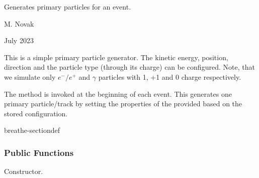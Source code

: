 \documentclass[letterpaper,10pt,english]{sphinxmanual}
\begin{document}
\begin{fulllineitems}
\label{\detokenize{Simulation/SimulationCodeDoc:_CPPv416PrimaryGenerator}}
\pysigstartsignatures
\pysigstartmultiline
{}
\pysigstopmultiline
\pysigstopsignatures
\sphinxAtStartPar
Generates primary particles for an event. 

\sphinxAtStartPar
\begin{description}
\sphinxAtStartPar
M. Novak 

\sphinxAtStartPar
July 2023

\end{description}


\sphinxAtStartPar
This is a simple primary particle generator. The kinetic energy, position, direction and the particle type (through its charge) can be configured. Note, that we simulate only \(e^-/e^+\) and \(\gamma\) particles with \sphinxhyphen{}1, +1 and 0 charge respectively.

\sphinxAtStartPar
The  method is invoked at the beginning of each event. This generates one primary particle/track by setting the properties of the provided  based on the stored configuration. 

\begin{sphinxuseclass}{breathe-sectiondef}\subsubsection*{Public Functions}

\begin{fulllineitems}
\label{\detokenize{Simulation/SimulationCodeDoc:_CPPv4N16PrimaryGenerator16PrimaryGeneratorEv}}
\pysigstartsignatures
\pysigstartmultiline
{}
\pysigstopmultiline
\pysigstopsignatures
\sphinxAtStartPar
Constructor. 


\end{fulllineitems}
\end{sphinxuseclass}
\end{fulllineitems}
\end{document}
